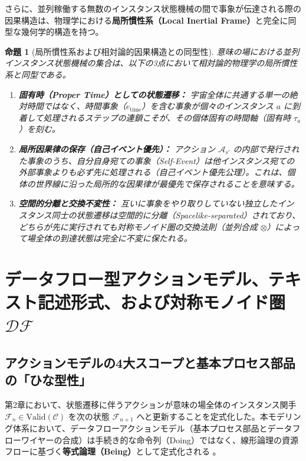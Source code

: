 \documentclass[11pt,a4paper]{ltjsarticle}
\theoremstyle{definition}
\theoremstyle{plain}
\newtheorem{proposition}{命題}[section]
\theoremstyle{remark}
\newcommand{\Valid}{\mathrm{Valid}}
\newcommand{\DF}{\mathcal{DF}}
\begin{document}
さらに、並列稼働する無数のインスタンス状態機械の間で事象が伝達される際の因果構造は、物理学における\textbf{局所慣性系（Local Inertial Frame）}と完全に同型な幾何学的構造を持つ。

\begin{proposition}[局所慣性系および相対論的因果構造との同型性]\label{prop:inertial-frame}
意味の場における並列インスタンス状態機械の集合は、以下の3点において相対論的物理学の局所慣性系と同型である。
\begin{enumerate}
    \item \textbf{固有時（Proper Time）としての状態遷移：} 宇宙全体に共通する単一の絶対時間ではなく、時間事象（$e_{\mathrm{time}}$）を含む事象が個々のインスタンス $a$ に到着して処理されるステップの連鎖こそが、その個体固有の時間軸（固有時 $\tau_a$）を刻む。
    \item \textbf{局所因果律の保存（自己イベント優先）：} アクション $\mathcal{A}_{s'}$ の内部で発行された事象のうち、自分自身宛ての事象（Self-Event）は他インスタンス宛ての外部事象よりも必ず先に処理される（自己イベント優先公理）。これは、個体の世界線に沿った局所的な因果律が最優先で保存されることを意味する。
    \item \textbf{空間的分離と交換不変性：} 互いに事象をやり取りしていない独立したインスタンス同士の状態遷移は空間的に分離（Spacelike-separated）されており、どちらが先に実行されても対称モノイド圏の交換法則（並列合成 $\otimes$）によって場全体の到達状態は完全に不変に保たれる。
\end{enumerate}
\end{proposition}
\section{データフロー型アクションモデル、テキスト記述形式、および対称モノイド圏 $\DF$}

\subsection{アクションモデルの4大スコープと基本プロセス部品の「ひな型性」}
第2章において、状態遷移に伴うアクションが意味の場全体のインスタンス関手 $\mathcal{F}_n \in \Valid(\mathcal{C})$ を次の状態 $\mathcal{F}_{n+1}$ へと更新することを定式化した。本モデリング体系において、データフローアクションモデル（基本プロセス部品とデータフローワイヤーの合成）は手続き的な命令列（Doing）ではなく、線形論理の資源フローに基づく\textbf{等式論理（Being）}として定式化される \cite{girard1987}。
\end{document}
